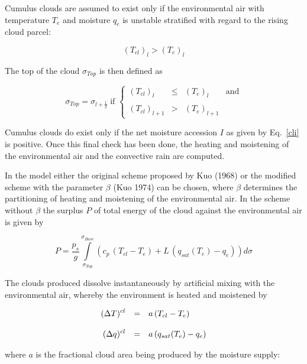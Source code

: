 Cumulus clouds are assumed to exist only if the
environmental air with temperature $T_e$ and
moisture $q_e$  is unstable stratified with regard to the
rising cloud parcel:

\begin{equation}
(T_{cl})_l > (T_e)_l
\end{equation}

The top of the cloud $\sigma_{Top}$ is then defined
as 

\begin{equation}
\sigma_{Top}=\sigma_{l+\frac{1}{2}} \; \mbox{if }
\left\{ \begin{array}{lcll} (T_{cl})_l &
\le & 
(T_{e})_l & \mbox{and} \\ &&& \\ (T_{cl})_{l+1} &
> & (T_{e})_{l+1} & \end{array}
\right.
\end{equation}

Cumulus clouds do exist only if the net moisture
accession $I$ as given by Eq.~\ref{cli} is
positive.
Once this final check has been done, the heating and
moistening of the environmental air and
the
convective rain are computed. 

In the model either the original scheme  proposed by
Kuo (1968) or the modified scheme with
the parameter $\beta$ (Kuo 1974) can be chosen,
where $\beta$ determines the partitioning of
heating and moistening of the environmental air. In the
scheme without $\beta$ the surplus $P$ 
of total energy of the cloud against the environmental
air is given by

\begin{equation}
P=\frac{p_s}{g}
\int\limits_{\sigma_{Top}}^{\sigma_{Base}} (c_p\,
(T_{cl} -T_{e}) + L\,
(q_{sat}(T_e)-q_{e})) d\sigma
\end{equation} 


The clouds produced dissolve instantaneously by
artificial mixing with the environmental air,
whereby the environment is heated and moistened by

\begin{equation}\label{handm}
\begin{array}{rcl}
\displaystyle (\Delta T)^{cl} & = & \displaystyle a \, (T_{cl} -T _e) \\
&&\\
\displaystyle (\Delta q)^{cl} & = & \displaystyle a \, (q_{sat}(T_e) -q _e) 
\end{array}
\end{equation}

where $a$ is the fractional cloud area being produced
by the moisture supply:

